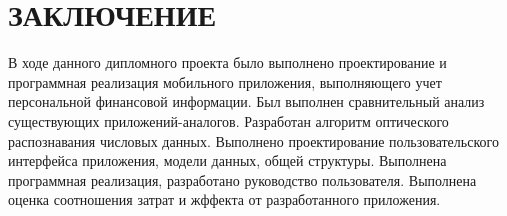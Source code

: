 \section*{ЗАКЛЮЧЕНИЕ}

{\color{red}
В ходе данного дипломного проекта было выполнено проектирование и
программная реализация мобильного приложения, выполняющего учет
персональной финансовой информации.
Был выполнен сравнительный анализ существующих приложений-аналогов.
Разработан алгоритм оптического распознавания числовых данных.
Выполнено проектирование пользовательского интерфейса приложения,
модели данных, общей структуры.
Выполнена программная реализация, разработано руководство пользователя.
Выполнена оценка соотношения затрат и жффекта от разработанного приложения.
}